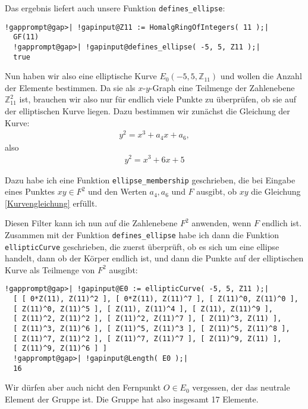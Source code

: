 \begin{enumerate}[label=\alph*)]
Das ergebnis liefert auch unsere Funktion \texttt{defines\_ellipse}:
\begin{Verbatim}[commandchars=!@|,fontsize=\small,frame=single,label=Example]
  !gapprompt@gap>| !gapinput@Z11 := HomalgRingOfIntegers( 11 );|
  GF(11)
  !gapprompt@gap>| !gapinput@defines_ellipse( -5, 5, Z11 );|
  true
\end{Verbatim}

Nun haben wir also eine elliptische Kurve $E_{0}(-5, 5, \mathbb{Z}_{11})$ und wollen die Anzahl der Elemente bestimmen.
Da sie als $x$-$y$-Graph eine Teilmenge der Zahlenebene $\mathbb{Z}_{11}^{2}$ ist, brauchen wir also nur für endlich viele
Punkte zu überprüfen, ob sie auf der elliptischen Kurve liegen. Dazu bestimmen wir zunächst die Gleichung der Kurve:
\begin{align}
y^2 =\label{Kurvengleichung} x^{3} + a_{4}x + a_{6},
\end{align}
also
\begin{align*}
y^{2} = x^{3} + 6x + 5
\end{align*}

Dazu habe ich eine Funktion \texttt{ellipse\_membership} geschrieben, die bei Eingabe eines Punktes $xy \in F^{2}$ und den
Werten $a_{4}, a_{6}$ und $F$ ausgibt, ob $xy$ die Gleichung \eqref{Kurvengleichung} erfüllt.

Diesen Filter kann ich nun auf die Zahlenebene $F^{2}$ anwenden, wenn $F$ endlich ist. Zusammen mit der Funktion \texttt{defines\_ellipse}
habe ich dann die Funktion \texttt{ellipticCurve} geschrieben, die zuerst überprüft, ob es sich um eine ellipse handelt, dann ob der Körper
endlich ist, und dann die Punkte auf der elliptischen Kurve als Teilmenge von $F^{2}$ ausgibt:

\begin{Verbatim}[commandchars=!@|,fontsize=\small,frame=single,label=Example]
  !gapprompt@gap>| !gapinput@E0 := ellipticCurve( -5, 5, Z11 );|
  [ [ 0*Z(11), Z(11)^2 ], [ 0*Z(11), Z(11)^7 ], [ Z(11)^0, Z(11)^0 ],
  [ Z(11)^0, Z(11)^5 ], [ Z(11), Z(11)^4 ], [ Z(11), Z(11)^9 ],
  [ Z(11)^2, Z(11)^2 ], [ Z(11)^2, Z(11)^7 ], [ Z(11)^3, Z(11) ],
  [ Z(11)^3, Z(11)^6 ], [ Z(11)^5, Z(11)^3 ], [ Z(11)^5, Z(11)^8 ],
  [ Z(11)^7, Z(11)^2 ], [ Z(11)^7, Z(11)^7 ], [ Z(11)^9, Z(11) ],
  [ Z(11)^9, Z(11)^6 ] ]
  !gapprompt@gap>| !gapinput@Length( E0 );|
  16
\end{Verbatim}
Wir dürfen aber auch nicht den Fernpunkt $O \in E_{0}$ vergessen, der das neutrale Element der Gruppe ist.
Die Gruppe hat also insgesamt 17 Elemente.


\end{enumerate}
